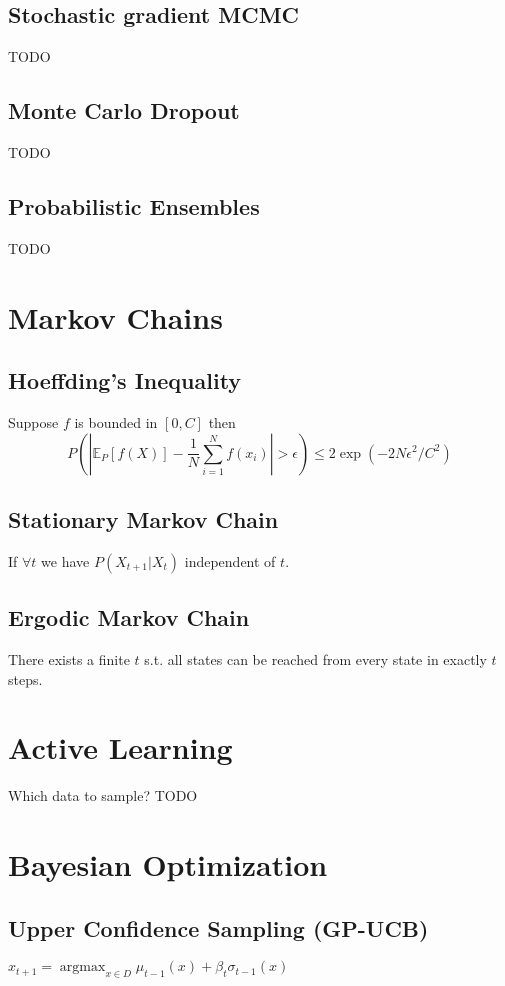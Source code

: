\documentclass[11pt]{article}
\newcommand{\argmax}{\operatorname{argmax}}
\newcommand{\E}{\mathbb{E}}
\begin{document}
\begin{multicols*}{3}
\subsection*{Stochastic gradient MCMC}
TODO
\subsection*{Monte Carlo Dropout}
TODO
\subsection*{Probabilistic Ensembles}
TODO




\section*{Markov Chains}

\subsection*{Hoeffding's Inequality}
Suppose $f$ is bounded in $\left[0,C\right]$ then $$P\left(| \E_P\left[f(X)\right] - \frac{1}{N} \sum_{i=1}^{N} f(x_i)| > \epsilon \right) \leq 2 \exp\left(-2N\epsilon^2/C^2\right)$$
\subsection*{Stationary Markov Chain}
If $\forall t$ we have $P(X_{t+1} | X_{t})$ independent of $t$.
\subsection*{Ergodic Markov Chain}
There exists a finite $t$ s.t. all states can be reached from every state in exactly $t$ steps.













\section*{Active Learning}
Which data to sample?
TODO

\section*{Bayesian Optimization}
\subsection*{Upper Confidence Sampling (GP-UCB)}
$x_{t+1} = \argmax_{x\in D} \mu_{t-1}(x) + \beta_t \sigma_{t-1} (x)$

\end{multicols*}
\end{document}
